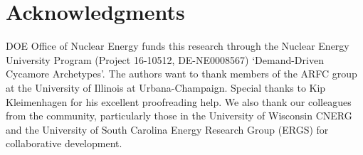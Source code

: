 \section{Acknowledgments}
\gls{DOE} Office of Nuclear Energy funds this research through 
the  Nuclear Energy University Program (Project 16-10512, DE-NE0008567) 
`Demand-Driven Cycamore Archetypes'. The authors want to thank 
members of the \gls{ARFC} group at the University of Illinois at 
Urbana-Champaign. 
Special thanks to Kip Kleimenhagen for his excellent proofreading 
help. 
We also thank our colleagues from the \Cyclus community, 
particularly those in the University of Wisconsin 
\gls{CNERG} and the University of South Carolina Energy Research 
Group (ERGS) for collaborative \Cyclus development.